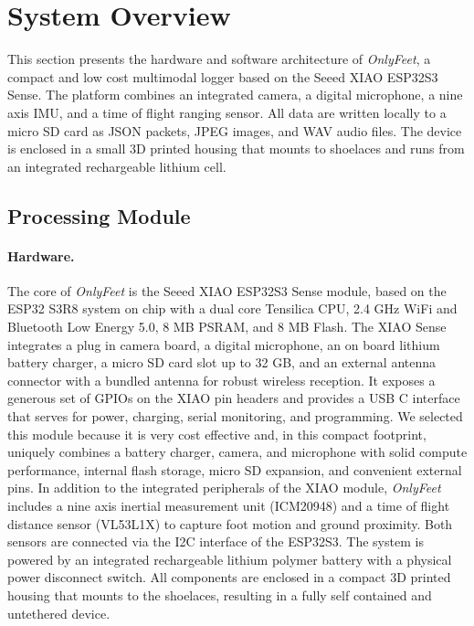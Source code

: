 \documentclass[manuscript,review,anonymous]{acmart}
\begin{document}
\section{System Overview}
This section presents the hardware and software architecture of \textit{OnlyFeet}, a compact and low cost multimodal logger based on the Seeed XIAO ESP32S3 Sense. The platform combines an integrated camera, a digital microphone, a nine axis IMU, and a time of flight ranging sensor. All data are written locally to a micro SD card as JSON packets, JPEG images, and WAV audio files. The device is enclosed in a small 3D printed housing that mounts to shoelaces and runs from an integrated rechargeable lithium cell.

\subsection{Processing Module}
\paragraph{Hardware.}
The core of \textit{OnlyFeet} is the Seeed XIAO ESP32S3 Sense module, based on the ESP32 S3R8 system on chip with a dual core Tensilica CPU, 2.4 GHz WiFi and Bluetooth Low Energy 5.0, 8 MB PSRAM, and 8 MB Flash. The XIAO Sense integrates a plug in camera board, a digital microphone, an on board lithium battery charger, a micro SD card slot up to 32 GB, and an external antenna connector with a bundled antenna for robust wireless reception. It exposes a generous set of GPIOs on the XIAO pin headers and provides a USB C interface that serves for power, charging, serial monitoring, and programming. We selected this module because it is very cost effective and, in this compact footprint, uniquely combines a battery charger, camera, and microphone with solid compute performance, internal flash storage, micro SD expansion, and convenient external pins. In addition to the integrated peripherals of the XIAO module, \textit{OnlyFeet} includes a nine axis inertial measurement unit (ICM20948) and a time of flight distance sensor (VL53L1X) to capture foot motion and ground proximity. Both sensors are connected via the I2C interface of the ESP32S3. The system is powered by an integrated rechargeable lithium polymer battery with a physical power disconnect switch. All components are enclosed in a compact 3D printed housing that mounts to the shoelaces, resulting in a fully self contained and untethered device.
\end{document}

